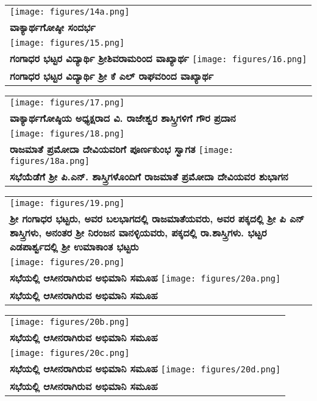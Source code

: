 {\tabcolsep=0pt
\noindent
\begin{tabular}{>{\centering}p{11cm}}
\texttt{[image: figures/14a.png]}\\
\textbf{ವಾಕ್ಯಾರ್ಥಗೋಷ್ಠೀ ಸಂದರ್ಭ}\\[12pt]
\texttt{[image: figures/15.png]}\\
\textbf{ಗಂಗಾಧರ ಭಟ್ಟರ ವಿದ್ಯಾರ್ಥಿ ಶ್ರೀಶಿವರಾಮರಿಂದ ವಾಖ್ಯಾರ್ಥ}
\texttt{[image: figures/16.png]}\\
\textbf{ಗಂಗಾಧರ ಭಟ್ಟರ ವಿದ್ಯಾರ್ಥಿ ಶ್ರೀ ಕೆ ಎಲ್ ರಾಘವರಿಂದ ವಾಖ್ಯಾರ್ಥ}
\end{tabular}
}

{\tabcolsep=0pt
\noindent
\begin{tabular}{>{\centering}p{11cm}}
\texttt{[image: figures/17.png]}\\
\textbf{ವಾಕ್ಯಾರ್ಥಗೋಷ್ಠಿಯ ಅಧ್ಯಕ್ಷರಾದ ವಿ. ರಾಜೇಶ್ವರ ಶಾಸ್ತ್ರಿಗಳಿಗೆ ಗೌರ ಪ್ರದಾನ}\\[12pt]
\texttt{[image: figures/18.png]}\\
\textbf{ರಾಜಮಾತೆ ಪ್ರಮೋದಾ ದೇವಿಯವರಿಗೆ ಪೂರ್ಣಕುಂಭ ಸ್ವಾಗತ}
\texttt{[image: figures/18a.png]}\\
\textbf{ಸಭೆಯೆಡೆಗೆ ಶ್ರೀ ಪಿ.ಎನ್. ಶಾಸ್ತ್ರಿಗಳೊಂದಿಗೆ ರಾಜಮಾತೆ ಪ್ರಮೋದಾ ದೇವಿಯವರ ಶುಭಾಗನ}
\end{tabular}
}

{\tabcolsep=0pt
\noindent
\begin{tabular}{>{\centering}p{11cm}}
\texttt{[image: figures/19.png]}\\
\textbf{ ಶ್ರೀ ಗಂಗಾಧರ ಭಟ್ಟರು, ಅವರ ಬಲಭಾಗದಲ್ಲಿ ರಾಜಮಾತೆಯವರು, ಅವರ ಪಕ್ಕದಲ್ಲಿ ಶ್ರೀ ಪಿ ಎನ್ ಶಾಸ್ತ್ರಿಗಳು, ಅನಂತರ ಶ್ರೀ ನಿರಂಜನ ವಾನಳ್ಳಿಯವರು, ಪಕ್ಕದಲ್ಲಿ ರಾ.ಶಾಸ್ತ್ರಿಗಳು. ಭಟ್ಟರ ಎಡಪಾರ್ಶ್ವದಲ್ಲಿ ಶ್ರೀ ಉಮಾಕಾಂತ ಭಟ್ಟರು}\\[12pt]
\texttt{[image: figures/20.png]}\\
\textbf{ಸಭೆಯಲ್ಲಿ  ಆಸೀನರಾಗಿರುವ ಅಭಿಮಾನಿ ಸಮೂಹ}
\texttt{[image: figures/20a.png]}\\
\textbf{ಸಭೆಯಲ್ಲಿ  ಆಸೀನರಾಗಿರುವ ಅಭಿಮಾನಿ ಸಮೂಹ}
\end{tabular}
}

{\tabcolsep=0pt
\noindent
\begin{tabular}{>{\centering}p{11cm}}
\texttt{[image: figures/20b.png]}\\
\textbf{ಸಭೆಯಲ್ಲಿ  ಆಸೀನರಾಗಿರುವ ಅಭಿಮಾನಿ ಸಮೂಹ}\\[12pt]
\texttt{[image: figures/20c.png]}\\
\textbf{ಸಭೆಯಲ್ಲಿ  ಆಸೀನರಾಗಿರುವ ಅಭಿಮಾನಿ ಸಮೂಹ}
\texttt{[image: figures/20d.png]}\\
\textbf{ಸಭೆಯಲ್ಲಿ  ಆಸೀನರಾಗಿರುವ ಅಭಿಮಾನಿ ಸಮೂಹ}
\end{tabular}
}

